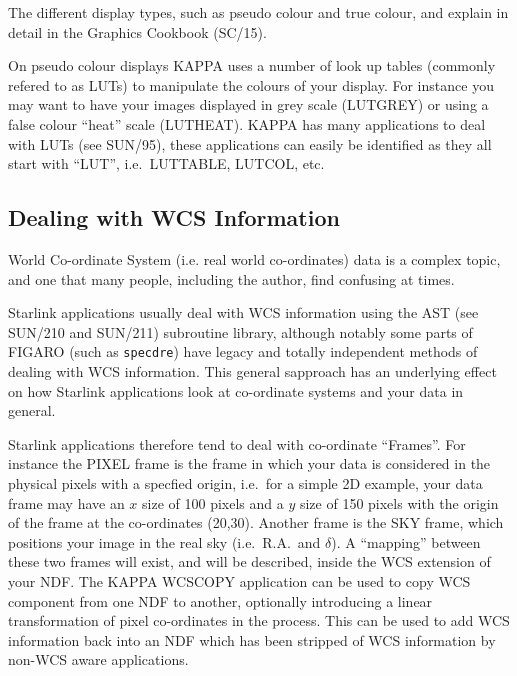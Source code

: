 \documentclass[twoside,11pt]{article}
\newcommand{\xref}[3]{#1}
\newcommand{\xlabel}[1]{}
\begin{document}
The different display types, such as \xref{pseudo colour}{sc15}{sc15_pseudo} and \xref{true colour}{sc15}{sc15_true}, and explain in detail in the \xref{Graphics Cookbook}{sc15}{} (SC/15).

On \xref{pseudo colour displays}{sc15}{sc15_pseudo} KAPPA uses a number of \xref{look up tables}{sun95}{se_lookuptables} (commonly refered to as LUTs) to manipulate the colours of your display. For instance you may want to have your images displayed in grey scale (\xref{LUTGREY}{sun95}{LUTGREY}) or using a false colour ``heat'' scale (\xref{LUTHEAT}{sun95}{LUTHEAT}). KAPPA has many applications to deal with LUTs (see \xref{SUN/95}{sun95}{}), these applications can easily be identified as they all start with ``LUT'', i.e.\ \xref{LUTTABLE}{sun95}{LUTABLE}, \xref{LUTCOL}{sun95}{LUTCOL}, etc.

\subsection{\xlabel{sc16_wcs}Dealing with WCS Information\label{sc16_wcs}}

World Co-ordinate System (i.e. real world co-ordinates) data is a complex topic, and one that many people, including the author, find confusing at times.

Starlink applications usually deal with WCS information using the \xref{AST}{sun210}{} (see SUN/210 and SUN/211) subroutine library, although notably some parts of FIGARO (such as {\tt specdre}) have legacy and totally independent methods of dealing with WCS information. This general sapproach has an underlying effect on how Starlink applications look at co-ordinate systems and your data in general.

Starlink applications therefore tend to deal with co-ordinate ``Frames''. For instance the PIXEL frame is the frame in which your data is considered in the physical pixels with a specfied origin, i.e.\ for a simple 2D example, your data frame may have an $x$ size of 100 pixels and a $y$ size of 150 pixels with the origin of the frame at the co-ordinates (20,30). Another frame is the SKY frame, which positions your image in the real sky (i.e.\ R.A.\ and $\delta$). A ``mapping'' between these two frames will exist, and will be described, inside the WCS extension of your NDF. The KAPPA \xref{WCSCOPY}{sun95}{WCSCOPY} application can be used to copy WCS component from one NDF to another, optionally introducing a linear transformation of pixel co-ordinates in the process. This can be used to add WCS information back into an NDF which has been stripped of WCS information by non-WCS aware applications.
\end{document}
